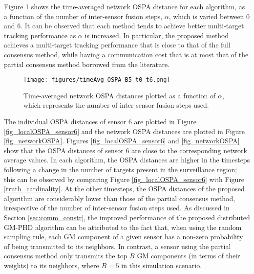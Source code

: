 Figure \ref{fig_timeAvg_OSPA_B5_t0_t6} shows the time-averaged network OSPA distance for each algorithm, as a function of the number of inter-sensor fusion steps, $\alpha$, which is varied between $0$ and $6$. It can be observed that each method tends to achieve better multi-target tracking performance as $\alpha$ is increased. In particular, the proposed method achieves a multi-target tracking performance that is close to that of the full consensus method, while having a communication cost that is at most that of the partial consensus method borrowed from the literature. 

\begin{figure}[h]
\centering
    \texttt{[image: figures/timeAvg\_OSPA\_B5\_t0\_t6.png]}
    \caption{Time-averaged network OSPA distances plotted as a function of $\alpha$, which represents the number of inter-sensor fusion steps used.}
    \label{fig_timeAvg_OSPA_B5_t0_t6}
\end{figure}

The individual OSPA distances of sensor 6 are plotted in Figure \ref{fig_localOSPA_sensor6} and the network OSPA distances are plotted in Figure \ref{fig_networkOSPA}. Figures \ref{fig_localOSPA_sensor6} and \ref{fig_networkOSPA} show that the OSPA distances of sensor 6 are close to the corresponding network average values. 
In each algorithm, the OSPA distances are higher in the timesteps following a change in the number of targets present in the surveillance region; this can be observed by comparing Figure \ref{fig_localOSPA_sensor6} with Figure \ref{truth_cardinality}. At the other timesteps, the OSPA distances of the proposed algorithm are considerably lower than those of the partial consensus method, irrespective of the number of inter-sensor fusion steps used. As discussed in Section \ref{sec:comm_constr}, the improved performance of the proposed distributed GM-PHD algorithm can be attributed to the fact that, when using the random sampling rule, each GM component of a given sensor has a non-zero probability of being transmitted to its neighbors. In contrast, a sensor using the partial consensus method only transmits the top $B$ GM components (in terms of their weights) to its neighbors, where $B=5$ in this simulation scenario.

